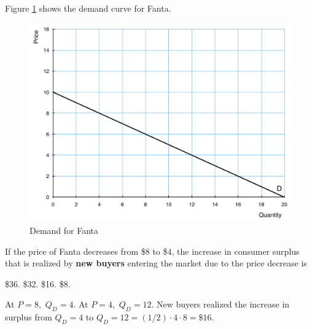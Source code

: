\documentclass[addpoints,11pt]{exam}
\theoremstyle{definition}
\begin{document}
\begin{questions}
\newpage
	
	\question Figure \ref{MC23} shows the demand curve for Fanta.
		
		\begin{figure}[H]
			\centering
			\includegraphics[scale=.45]{Exam1_MC22.pdf}
			\caption{Demand for Fanta}
			\label{MC23}
		\end{figure}
		
		If the price of Fanta decreases from \$8 to \$4, the increase in consumer surplus that is realized by \textbf{new buyers} entering the market due to the price decrease is 
		
		\begin{choices}
			\choice \$36.
			\choice \$32.
			\CorrectChoice \$16.
			\choice \$8.
		\end{choices}	
		
		\begin{solution}
			At $P=8,$ $Q_D = 4.$ At $P = 4,$ $Q_D = 12.$ New buyers realized the increase in surplus from $Q_D = 4$ to $Q_D = 12 = (1/2)\cdot4\cdot8=\$16.$
		\end{solution}


		
		

\end{questions}
\end{document}
